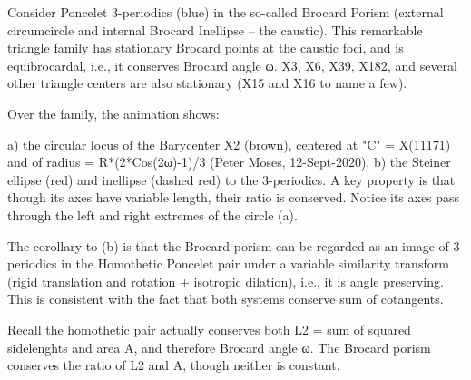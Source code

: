 Consider Poncelet 3-periodics (blue) in the so-called Brocard Porism (external circumcircle and internal Brocard Inellipse -- the caustic). This remarkable triangle family has stationary Brocard points at the caustic foci, and is equibrocardal, i.e., it conserves Brocard angle ω. X3, X6, X39, X182, and several other triangle centers are also stationary (X15 and X16 to name a few).

Over the family, the animation shows:

a) the circular locus of the Barycenter X2 (brown), centered at "C" = X(11171) and of
radius = R*(2*Cos(2ω)-1)/3 (Peter Moses, 12-Sept-2020).
b) the Steiner ellipse (red) and inellipse (dashed red) to the 3-periodics. A key  property is that though its axes have variable length, their ratio is conserved. Notice its axes pass through the left and right extremes of the circle (a).

The corollary to (b) is that the Brocard porism can be regarded as an image of 3-periodics in the Homothetic Poncelet pair under a variable similarity transform (rigid translation and rotation + isotropic dilation), i.e., it is angle preserving. This is consistent with the fact that both systems conserve sum of cotangents.

Recall the homothetic pair actually conserves both L2 = sum of squared sidelenghts and area A, and therefore Brocard angle ω. The Brocard porism conserves the ratio of L2 and A, though neither is constant.